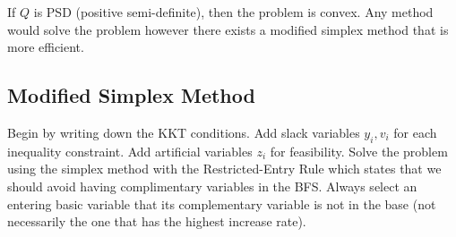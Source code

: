 \documentclass{report}
\begin{document}
If $Q$ is PSD (positive semi-definite), then the problem is convex. Any method would solve the problem however there exists a modified simplex method that is more efficient.

\subsection{Modified Simplex Method}

\begin{itemize}
	\ii Begin by writing down the KKT conditions.
	\ii Add slack variables $y_i, v_i$ for each inequality constraint.
	\ii Add artificial variables $z_i$ for feasibility.
	\ii Solve the problem using the simplex method with the Restricted-Entry Rule which states that we should avoid having complimentary variables in the BFS. Always select an entering basic variable that its complementary variable is not in the base (not necessarily the one that has the highest increase rate).
\end{itemize}
\end{document}
